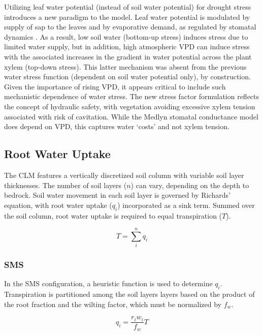 \documentclass[draft,linenumbers]{agujournal}
\begin{document}
    Utilizing leaf water potential (instead of soil water potential) for drought stress introduces a new paradigm to the model. 
    Leaf water potential is modulated by supply of sap to the leaves and by evaporative demand, as regulated by stomatal dynamics \citep{novick2016a}. 
    As a result, low soil water (bottom-up stress) induces stress due to limited water supply, but in addition, high atmospheric VPD can induce stress with the associated increases in the gradient in water potential across the plant xylem (top-down stress). 
    This latter mechanism was absent from the previous water stress function (dependent on soil water potential only), by construction.
    Given the importance of rising VPD, it appears critical to include such mechanistic dependence of water stress.
    The new stress factor formulation reflects the concept of hydraulic safety, with vegetation avoiding excessive xylem tension associated with risk of cavitation.
    While the Medlyn stomatal conductance model does depend on VPD, this captures water `costs' and not xylem tension.

\subsection{Root Water Uptake}
\label{sect:rwu}
    The CLM features a vertically discretized soil column with variable soil layer thicknesses.
    The number of soil layers ($n$) can vary, depending on the depth to bedrock.
    Soil water movement in each soil layer is governed by Richards' equation, with root water uptake ($q_i$) incorporated as a sink term.
    Summed over the soil column, root water uptake is required to equal transpiration ($T$).

    \begin{linenomath*}
    \begin{equation}
    T = \sum^n_i{q_i}
    \end{equation}
    \end{linenomath*} 

\subsubsection{SMS}
    
    In the SMS configuration, a heuristic function is used to determine $q_i$.
    Transpiration is partitioned among the soil layers layers based on the product of the root fraction and the wilting factor, which must be normalized by $f_w$. 
    
    \begin{linenomath*}
    \begin{equation}
    \label{bt:4}
    q_i = \dfrac{r_i w_i}{f_w}T
    \end{equation}
    \end{linenomath*}
    
\end{document}
